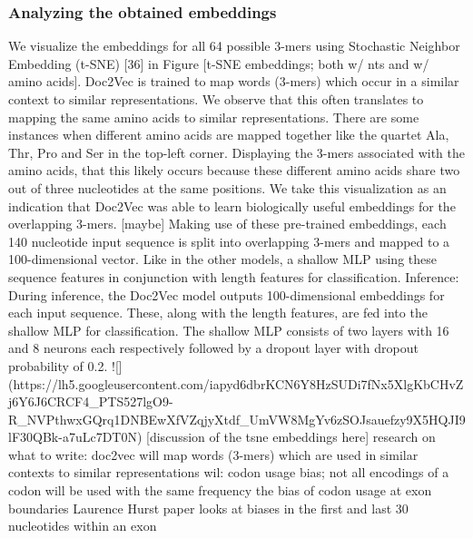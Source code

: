 \subsubsection{Analyzing the obtained embeddings}
We visualize the embeddings for all 64 possible 3-mers using Stochastic Neighbor Embedding (t-SNE) [36] in Figure [t-SNE embeddings; both w/ nts and w/ amino acids].
Doc2Vec is trained to map words (3-mers) which occur in a similar context to similar representations. We observe that this often translates to mapping the same amino acids to similar representations. There are some instances when different amino acids are mapped together like the quartet Ala, Thr, Pro and Ser in the top-left corner. Displaying the 3-mers associated with the amino acids, that this likely occurs because these different amino acids share two out of three nucleotides at the same positions. We take this visualization as an indication that Doc2Vec was able to learn biologically useful embeddings for the overlapping 3-mers.
[maybe] Making use of these pre-trained embeddings, each 140 nucleotide input sequence is split into overlapping 3-mers and mapped to a 100-dimensional vector. Like in the other models, a shallow MLP using these sequence features in conjunction with length features for classification.
Inference:
During inference, the Doc2Vec model outputs 100-dimensional embeddings for each input sequence. These, along with the length features, are fed into the shallow MLP for classification. The shallow MLP consists of two layers with 16 and 8 neurons each respectively followed by a dropout layer with dropout probability of 0.2.
![](https://lh5.googleusercontent.com/iapyd6dbrKCN6Y8HzSUDi7fNx5XlgKbCHvZj6Y6J6CRCF4_PTS527lgO9-R_NVPthwxGQrq1DNBEwXfVZqjyXtdf_UmVW8MgYv6zSOJsauefzy9X5HQJI9lF30QBk-a7uLc7DT0N)
[discussion of the tsne embeddings here]
research on what to write:
doc2vec will map words (3-mers) which are used in similar contexts to similar representations
wil: codon usage bias; not all encodings of a codon will be used with the same frequency
the bias of codon usage at exon boundaries
Laurence Hurst paper looks at biases in the first and last 30 nucleotides within an exon
